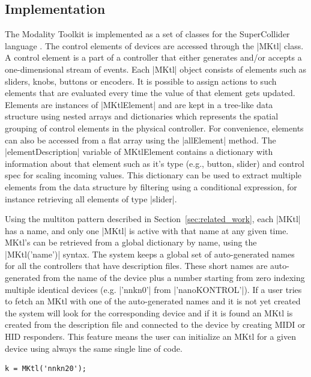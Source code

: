 \documentclass{article}
\begin{document}
\subsection{Implementation}
\label{sub:implementation}

The Modality Toolkit is implemented as a set of classes for the SuperCollider language \cite{mccartney2002-ret}. 
The control elements of devices are accessed through the |MKtl| class. 
A control element is a part of a controller that either generates and/or accepts a one-dimensional stream of events. 
Each |MKtl| object consists of elements such as sliders, knobs, buttons or encoders.
It is possible to assign actions to such elements that are evaluated every time the value of that element gets updated.
Elements are instances of |MKtlElement| and are kept in a tree-like data structure using nested arrays and dictionaries which represents the spatial grouping of control elements in the physical controller. 
For convenience, elements can also be accessed from a flat array using the |allElement| method. 
The |elementDescription| variable of MKtlElement contains a dictionary with information about that element such as it's type (e.g., button, slider) and control spec for scaling incoming values. 
This dictionary can be used to extract multiple elements from the data structure by filtering using a conditional expression, for instance retrieving all elements of type |slider|.

Using the multiton pattern described in Section~\ref{sec:related_work}, each |MKtl| has a name, and only one |MKtl| is active with that name at any given time. 
MKtl's can be retrieved from a global dictionary by name, using the |MKtl('name')| syntax. 
The system keeps a global set of auto-generated names for all the controllers that have description files. These short names are auto-generated from the name of the device plus a number starting from zero indexing multiple identical devices (e.g. |'nnkn0'| from |'nanoKONTROL'|). If a user tries to fetch an MKtl with one of the auto-generated names and it is not yet created the system will look for the corresponding device and if it is found an MKtl is created from the description file and connected to the device by creating MIDI or HID responders. This feature means the user can initialize an MKtl for a given device using always the same single line of code.

\begin{Verbatim}
k = MKtl('nnkn20');
\end{Verbatim}
\end{document}
